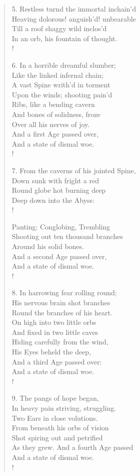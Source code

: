 \documentclass[9pt]{extarticle}
\begin{document}
\begin{verse}
\begin{altverse}
		5. Restless turnd the immortal inchain'd\\
		Heaving dolorous! anguish'd! unbearable\\
		Till a roof shaggy wild inclos'd\\
		In an orb, his fountain of thought.\\!
		
		6. In a horrible dreamful slumber;\\
		Like the linked infernal chain;\\
		A vast Spine writh'd in torment\\
		Upon the winds; shooting pain'd\\
		Ribs, like a bending cavern\\
		And bones of solidness, froze\\
		Over all his nerves of joy.\\
		And a first Age passed over,\\
		And a state of dismal woe.\\!
		
		7. From the caverns of his jointed Spine,\\
		Down sunk with fright a red\\
		Round globe hot burning deep\\
		Deep down into the Abyss:\\!
		
		Panting: Conglobing, Trembling\\
		Shooting out ten thousand branches\\
		Around his solid bones.\\
		And a second Age passed over,\\
		And a state of dismal woe.\\!
		
		8. In harrowing fear rolling round;\\
		His nervous brain shot branches\\
		Round the branches of his heart.\\
		On high into two little orbs\\
		And fixed in two little caves\\
		Hiding carefully from the wind,\\
		His Eyes beheld the deep,\\
		And a third Age passed over:\\
		And a state of dismal woe.\\!
		
		9. The pangs of hope began,\\
		In heavy pain striving, struggling.\\
		Two Ears in close volutions.\\
		From beneath his orbs of vision\\
		Shot spiring out and petrified\\
		As they grew. And a fourth Age passed\\
		And a state of dismal woe.\\!
		

\end{altverse}
\end{verse}
\end{document}
